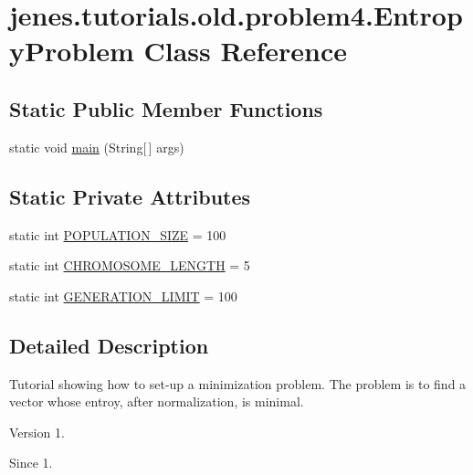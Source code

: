 \hypertarget{classjenes_1_1tutorials_1_1old_1_1problem4_1_1_entropy_problem}{\section{jenes.\-tutorials.\-old.\-problem4.\-Entropy\-Problem Class Reference}
\label{classjenes_1_1tutorials_1_1old_1_1problem4_1_1_entropy_problem}
}
\subsection*{Static Public Member Functions}
\begin{DoxyCompactItemize}
\item 
static void \hyperlink{classjenes_1_1tutorials_1_1old_1_1problem4_1_1_entropy_problem_a0d51bbf6082f703157baaa168dd5f217}{main} (String\mbox{[}$\,$\mbox{]} args)
\end{DoxyCompactItemize}
\subsection*{Static Private Attributes}
\begin{DoxyCompactItemize}
\item 
static int \hyperlink{classjenes_1_1tutorials_1_1old_1_1problem4_1_1_entropy_problem_a8b85592ca8d79e8511f8881f9b21d339}{P\-O\-P\-U\-L\-A\-T\-I\-O\-N\-\_\-\-S\-I\-Z\-E} = 100
\item 
static int \hyperlink{classjenes_1_1tutorials_1_1old_1_1problem4_1_1_entropy_problem_a0f7164bda94dc9776ef68f76b21c27bf}{C\-H\-R\-O\-M\-O\-S\-O\-M\-E\-\_\-\-L\-E\-N\-G\-T\-H} = 5
\item 
static int \hyperlink{classjenes_1_1tutorials_1_1old_1_1problem4_1_1_entropy_problem_a1fee67242d5c7f78732adfee999a4623}{G\-E\-N\-E\-R\-A\-T\-I\-O\-N\-\_\-\-L\-I\-M\-I\-T} = 100
\end{DoxyCompactItemize}


\subsection{Detailed Description}
Tutorial showing how to set-\/up a minimization problem. The problem is to find a vector whose entroy, after normalization, is minimal.

\begin{DoxyVersion}{Version}
1. 
\end{DoxyVersion}
\begin{DoxySince}{Since}
1. 
\end{DoxySince}


